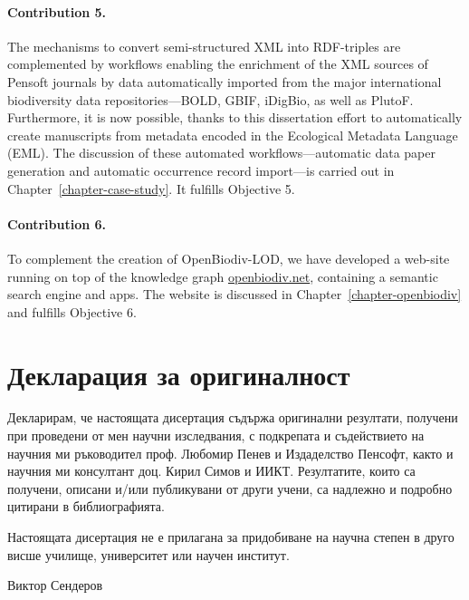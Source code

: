 \paragraph{Contribution 5.} The mechanisms to convert semi-structured XML into RDF-triples are complemented by workflows enabling the enrichment of the XML sources of Pensoft journals by data automatically imported from the major international biodiversity data repositories---BOLD, GBIF, iDigBio, as well as PlutoF. Furthermore, it is now possible, thanks to this dissertation effort to automatically create manuscripts from metadata encoded in the Ecological Metadata Language (EML). The discussion of these automated workflows---automatic data paper generation and automatic occurrence record import---is carried out in Chapter~\ref{chapter-case-study}. It fulfills Objective 5.

\paragraph{Contribution 6.} To complement the creation of OpenBiodiv-LOD, we have developed a web-site running on top of the knowledge graph \href{http://openbiodiv.net}{openbiodiv.net}, containing a semantic search engine and apps. The website is discussed in Chapter~\ref{chapter-openbiodiv} and fulfills Objective 6.

\section*{Декларация за оригиналност}

Декларирам, че настоящата дисертация съдържа оригинални резултати, получени 
при проведени от мен научни изследвания, с подкрепата и съдействието на научния ми ръководител проф. Любомир Пенев и Издаделство Пенсофт, както и научния ми консултант доц. Кирил Симов и ИИКТ.  Резултатите,  които  са  получени,  описани  и/или  публикувани  от  други учени, са надлежно и подробно цитирани в библиографията.

Настоящата дисертация не е прилагана за придобиване на научна степен в друго 
висше училище, университет или научен институт.

Виктор Сендеров


